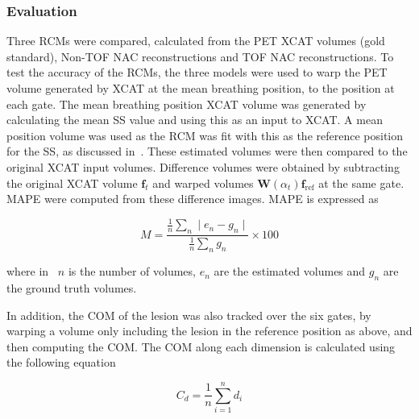             \subsubsection{Evaluation} \label{sec:impact_of_tof_on_respiratory_motion_model_estimation_using_pre_gated_no_intra_cycle_motion_nAC_pet_methods_evaluation}
                Three \glspl{RCM} were compared, calculated from the \gls{PET} \gls{XCAT} volumes (gold standard), \gls{Non-TOF} \gls{NAC} reconstructions and \gls{TOF} \gls{NAC} reconstructions. To test the accuracy of the \glspl{RCM}, the three models were used to warp the \gls{PET} volume generated by \gls{XCAT} at the mean breathing position, to the position at each gate. The mean breathing position \gls{XCAT} volume was generated by calculating the mean \gls{SS} value and using this as an input to \gls{XCAT}. A mean position volume was used as the \gls{RCM} was fit with this as the reference position for the \gls{SS}, as discussed in~. These estimated volumes were then compared to the original \gls{XCAT} input volumes. Difference volumes were obtained by subtracting the original \gls{XCAT} volume $\mathbf{f}_t$ and warped volumes $\mathbf{W}(\alpha_t) \mathbf{f}_\mathrm{ref}$ at the same gate. \gls{MAPE} were computed from these difference images. \gls{MAPE} is expressed as
                
                \begin{equation} \label{eq:impact_of_tof_on_respiratory_motion_model_estimation_using_pre_gated_no_intra_cycle_motion_nAC_pet_methods_mape}
                   M = \frac{\frac{1}{n}\sum_{n}\mid e_n - g_n \mid}{\frac{1}{n}\sum_{n}g_n} \times 100
                \end{equation}
                
                \noindent where in~ $n$ is the number of volumes, $e_n$ are the estimated volumes and $g_n$ are the ground truth volumes.
                
                In addition, the \gls{COM} of the lesion was also tracked over the six gates, by warping a volume only including the lesion in the reference position as above, and then computing the \gls{COM}. The \gls{COM} along each dimension is calculated using the following equation
                
                \begin{equation} \label{eq:impact_of_tof_on_respiratory_motion_model_estimation_using_pre_gated_no_intra_cycle_motion_nAC_pet_methods_com}
                   C_{d} = \frac{1}{n}\sum_{i = 1}^{n} d_{i}
                \end{equation}
                
